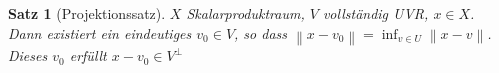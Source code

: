 \documentclass[ngerman]{report}
\theoremstyle{plain}%
\newtheorem{thm}{Satz}[chapter]
\theoremstyle{definition}%
\theoremstyle{myStyle}
\newcommand{\norm}[1]{\left \|#1\right\| }
\newcommand*{\rechterWinkel}[3]{%
\draw[shift={(#2:#3)}] (#1) arc[start angle=#2, delta angle=90, radius = #3];
\fill[shift={(#2+45:#3/2)}] (#1) circle[radius=1.25\pgflinewidth];
}
\begin{document}
	\begin{thm}[Projektionssatz]
		$X$ Skalarproduktraum, $V$ vollständig UVR, $x\in X$. Dann existiert ein eindeutiges $v_0 \in V$, so dass $\norm{x - v_0} = \inf_{v\in U} \norm{x - v}$. Dieses $v_0$ erfüllt $x - v_0 \in V^\perp$	
	\end{thm}

\end{document}
